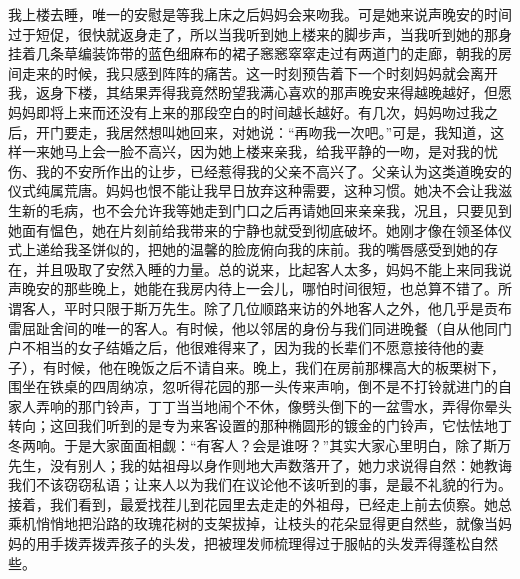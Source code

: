 \par 我上楼去睡，唯一的安慰是等我上床之后妈妈会来吻我。可是她来说声晚安的时间过于短促，很快就返身走了，所以当我听到她上楼来的脚步声，当我听到她的那身挂着几条草编装饰带的蓝色细麻布的裙子窸窸窣窣走过有两道门的走廊，朝我的房间走来的时候，我只感到阵阵的痛苦。这一时刻预告着下一个时刻妈妈就会离开我，返身下楼，其结果弄得我竟然盼望我满心喜欢的那声晚安来得越晚越好，但愿妈妈即将上来而还没有上来的那段空白的时间越长越好。有几次，妈妈吻过我之后，开门要走，我居然想叫她回来，对她说：“再吻我一次吧。”可是，我知道，这样一来她马上会一脸不高兴，因为她上楼来亲我，给我平静的一吻，是对我的忧伤、我的不安所作出的让步，已经惹得我的父亲不高兴了。父亲认为这类道晚安的仪式纯属荒唐。妈妈也恨不能让我早日放弃这种需要，这种习惯。她决不会让我滋生新的毛病，也不会允许我等她走到门口之后再请她回来亲亲我，况且，只要见到她面有愠色，她在片刻前给我带来的宁静也就受到彻底破坏。她刚才像在领圣体仪式上递给我圣饼似的，把她的温馨的脸庞俯向我的床前。我的嘴唇感受到她的存在，并且吸取了安然入睡的力量。总的说来，比起客人太多，妈妈不能上来同我说声晚安的那些晚上，她能在我房内待上一会儿，哪怕时间很短，也总算不错了。所谓客人，平时只限于斯万先生。除了几位顺路来访的外地客人之外，他几乎是贡布雷屈趾舍间的唯一的客人。有时候，他以邻居的身份与我们同进晚餐（自从他同门户不相当的女子结婚之后，他很难得来了，因为我的长辈们不愿意接待他的妻子），有时候，他在晚饭之后不请自来。晚上，我们在房前那棵高大的板栗树下，围坐在铁桌的四周纳凉，忽听得花园的那一头传来声响，倒不是不打铃就进门的自家人弄响的那门铃声，丁丁当当地闹个不休，像劈头倒下的一盆雪水，弄得你晕头转向；这回我们听到的是专为来客设置的那种椭圆形的镀金的门铃声，它怯怯地丁冬两响。于是大家面面相觑：“有客人？会是谁呀？”其实大家心里明白，除了斯万先生，没有别人；我的姑祖母以身作则地大声数落开了，她力求说得自然：她教诲我们不该窃窃私语；让来人以为我们在议论他不该听到的事，是最不礼貌的行为。接着，我们看到，最爱找茬儿到花园里去走走的外祖母，已经走上前去侦察。她总乘机悄悄地把沿路的玫瑰花树的支架拔掉，让枝头的花朵显得更自然些，就像当妈妈的用手拨弄拨弄孩子的头发，把被理发师梳理得过于服帖的头发弄得蓬松自然些。
